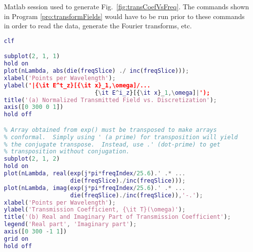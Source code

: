 \begin{program}
Matlab session used to generate Fig.\
\ref{fig:transCoefVsFreq}.  The commands shown in Program
\ref{pro:transformFields} would have to be run prior to these
commands in order to read the data, generate the Fourier transforms, etc.
 \label{pro:transCoefficient}
\codemiddle
\begin{lstlisting}[language=Matlab]
clf

subplot(2, 1, 1)
hold on
plot(nLambda, abs(die(freqSlice) ./ inc(freqSlice)));
xlabel('Points per Wavelength');
ylabel('|{\it E^t_z}[{\it x}_1,\omega]/...
                          {\it E^i_z}[{\it x}_1,\omega]|');
title('(a) Normalized Transmitted Field vs. Discretization');
axis([0 300 0 1])
hold off

% Array obtained from exp() must be transposed to make arrays
% conformal.  Simply using ' (a prime) for transposition will yield
% the conjugate transpose.  Instead, use .' (dot-prime) to get
% transposition without conjugation.
subplot(2, 1, 2)
hold on
plot(nLambda, real(exp(j*pi*freqIndex/25.6).' .* ...
                   die(freqSlice)./inc(freqSlice)));
plot(nLambda, imag(exp(j*pi*freqIndex/25.6).' .* ...
                   die(freqSlice)./inc(freqSlice)),'-.');
xlabel('Points per Wavelength');
ylabel('Transmission Coefficient, {\it T}(\omega)');
title('(b) Real and Imaginary Part of Transmission Coefficient');
legend('Real part', 'Imaginary part');
axis([0 300 -1 1])
grid on
hold off
\end{lstlisting}
\end{program}
